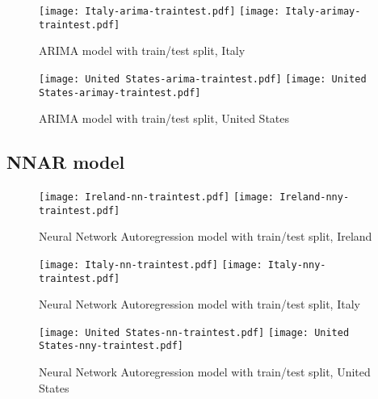 \begin{figure}[H]
  \texttt{[image: Italy-arima-traintest.pdf]} \label{fig:italy-arima-traintest}
\endminipage\hfill
{}
  \texttt{[image: Italy-arimay-traintest.pdf]} \label{fig:italy-arimay-traintest}
\endminipage
\caption{ARIMA model with train/test split, Italy}
\end{figure}

\begin{figure}[H]
  \texttt{[image: United States-arima-traintest.pdf]} \label{fig:us-arima-traintest}
\endminipage\hfill
{}
  \texttt{[image: United States-arimay-traintest.pdf]} \label{fig:us-arimay-traintest}
\endminipage
\caption{ARIMA model with train/test split, United States}
\end{figure}

\subsection{NNAR model}
\begin{figure}[H]
  \texttt{[image: Ireland-nn-traintest.pdf]} \label{fig:ireland-nn-traintest}
\endminipage\hfill
{}
  \texttt{[image: Ireland-nny-traintest.pdf]} \label{fig:ireland-nny-traintest}
\endminipage
\caption{Neural Network Autoregression model with train/test split, Ireland}
\end{figure}

\begin{figure}[H]
  \texttt{[image: Italy-nn-traintest.pdf]} \label{fig:italy-nn-traintest}
\endminipage\hfill
{}
  \texttt{[image: Italy-nny-traintest.pdf]} \label{fig:italy-nny-traintest}
\endminipage
\caption{Neural Network Autoregression model with train/test split, Italy}
\end{figure}

\begin{figure}[H]
  \texttt{[image: United States-nn-traintest.pdf]} \label{fig:us-nn-traintest}
\endminipage\hfill
{}
  \texttt{[image: United States-nny-traintest.pdf]} \label{fig:us-nny-traintest}
\endminipage
\caption{Neural Network Autoregression model with train/test split, United States}
\end{figure}